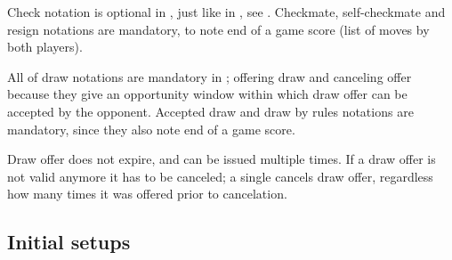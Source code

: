 Check notation is optional in , just like in , see
. Checkmate, self-checkmate and resign notations are mandatory,
to note end of a game score (list of moves by both players).

All of draw notations are mandatory in ; offering draw and canceling
offer because they give an opportunity window within which draw offer can be
accepted by the opponent. Accepted draw and draw by rules notations are mandatory,
since they also note end of a game score.

Draw offer does not expire, and can be issued multiple times. If a draw offer is
not valid anymore it has to be canceled; a single \alg{(-)} cancels draw offer,
regardless how many times it was offered prior to cancelation.

\clearpage %

\subsection*{Initial setups}
\label{sec:Appendix/Summary/Initial setups}

